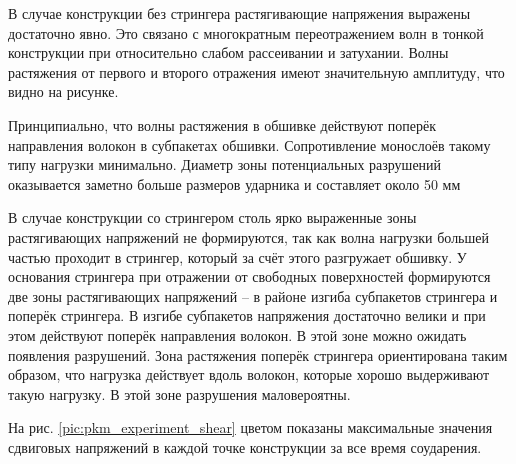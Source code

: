В случае конструкции без стрингера растягивающие напряжения выражены достаточно явно. Это связано с многократным переотражением волн в тонкой конструкции при относительно слабом рассеивании и затухании. Волны растяжения от первого и второго отражения имеют значительную амплитуду, что видно на рисунке.

Принципиально, что волны растяжения в обшивке действуют поперёк направления волокон в субпакетах обшивки. Сопротивление монослоёв такому типу нагрузки минимально. Диаметр зоны потенциальных разрушений оказывается заметно больше размеров ударника и составляет около 50 мм

В случае конструкции со стрингером столь ярко выраженные зоны растягивающих напряжений не формируются, так как волна нагрузки большей частью проходит в стрингер, который за счёт этого разгружает обшивку. У основания стрингера при отражении от свободных поверхностей формируются две зоны растягивающих напряжений -- в районе изгиба субпакетов стрингера и поперёк стрингера. В изгибе субпакетов напряжения достаточно велики и при этом действуют поперёк направления волокон. В этой зоне можно ожидать появления разрушений. Зона растяжения поперёк стрингера ориентирована таким образом, что нагрузка действует вдоль волокон, которые хорошо выдерживают такую нагрузку. В этой зоне разрушения маловероятны.




На рис. \ref{pic:pkm_experiment_shear} цветом показаны максимальные значения сдвиговых напряжений в каждой точке конструкции за все время соударения.

